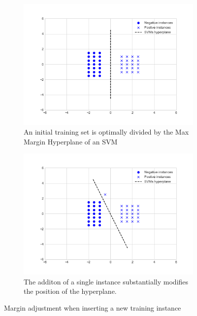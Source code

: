 \begin{figure}
  \centering
  \begin{subfigure}{.5\textwidth}
    \centering
    \captionsetup{width=.95\linewidth}
    \includegraphics[width=.95\linewidth]{files/figures/method/soft_margin_normal}
    \caption{An initial training set is optimally divided by the Max Margin
    Hyperplane of an SVM}
    \label{fig:sub1}
  \end{subfigure}%
  \begin{subfigure}{.5\textwidth}
    \centering
    \captionsetup{width=.95\linewidth}
    \includegraphics[width=.95\linewidth]{files/figures/method/soft_margin_high_c}
    \caption{The additon of a single instance substantially modifies
    the position of the hyperplane.}
    \label{fig:sub2}
  \end{subfigure}
  \caption{Margin adjustment when inserting a new training instance}
  \label{fig:soft_margin_high_c}
\end{figure}


